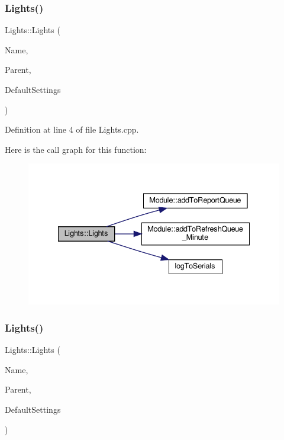 \subsubsection{\texorpdfstring{Lights()}{Lights()}\hspace{0.1cm}{\footnotesize\ttfamily [1/2]}}
{\footnotesize\ttfamily Lights\+::\+Lights (\begin{DoxyParamCaption}\item[{const \+\_\+\+\_\+\+Flash\+String\+Helper $\ast$}]{Name,  }\item[{\hyperlink{class_module}{Module} $\ast$}]{Parent,  }\item[{\hyperlink{struct_settings_1_1_lights_settings}{Settings\+::\+Lights\+Settings} $\ast$}]{Default\+Settings }\end{DoxyParamCaption})}



Definition at line 4 of file Lights.\+cpp.

Here is the call graph for this function\+:
\nopagebreak
\begin{figure}[H]
\begin{center}
\leavevmode
\includegraphics[width=335pt]{class_lights_a48acde7f45e4b9b22969e52fea689040_cgraph}
\end{center}
\end{figure}
\mbox{\label{class_lights_a48acde7f45e4b9b22969e52fea689040}} 
\subsubsection{\texorpdfstring{Lights()}{Lights()}\hspace{0.1cm}{\footnotesize\ttfamily [2/2]}}
{\footnotesize\ttfamily Lights\+::\+Lights (\begin{DoxyParamCaption}\item[{const \+\_\+\+\_\+\+Flash\+String\+Helper $\ast$}]{Name,  }\item[{\hyperlink{class_module}{Module} $\ast$}]{Parent,  }\item[{\hyperlink{struct_settings_1_1_lights_settings}{Settings\+::\+Lights\+Settings} $\ast$}]{Default\+Settings }\end{DoxyParamCaption})}



